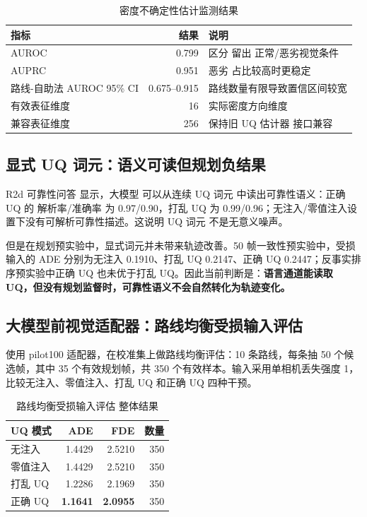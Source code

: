 \documentclass[12pt, a4paper]{ctexart}
\begin{document}
\begin{table}[H]
\centering
\caption{密度不确定性估计监测结果}
\begin{tabular}{lrp{6.5cm}}
\toprule
\textbf{指标} & \textbf{结果} & \textbf{说明} \\
\midrule
AUROC & 0.799 & 区分 留出 正常/恶劣视觉条件 \\
AUPRC & 0.951 & 恶劣 占比较高时更稳定 \\
路线-自助法 AUROC 95\% CI & 0.675--0.915 & 路线数量有限导致置信区间较宽 \\
有效表征维度 & 16 & 实际密度方向维度 \\
兼容表征维度 & 256 & 保持旧 UQ 估计器 接口兼容 \\
\bottomrule
\end{tabular}
\end{table}

\subsection{显式 UQ 词元：语义可读但规划负结果}

R2d 可靠性问答 显示，大模型 可以从连续 UQ 词元 中读出可靠性语义：正确 UQ 的 解析率/准确率 为 0.97/0.90，打乱 UQ 为 0.99/0.96；无注入/零值注入设置下没有可解析可靠性描述。这说明 UQ 词元 不是无意义噪声。

但是在规划预实验中，显式词元并未带来轨迹改善。50 帧一致性预实验中，受损输入的 ADE 分别为无注入 0.1910、打乱 UQ 0.2147、正确 UQ 0.2447；反事实排序预实验中正确 UQ 也未优于打乱 UQ。因此当前判断是：\textbf{语言通道能读取 UQ，但没有规划监督时，可靠性语义不会自然转化为轨迹变化。}

\subsection{大模型前视觉适配器：路线均衡受损输入评估}

使用 pilot100 适配器，在校准集上做路线均衡评估：10 条路线，每条抽 50 个候选帧，其中 35 个有效规划帧，共 350 个有效样本。输入采用单相机丢失强度 1，比较无注入、零值注入、打乱 UQ 和正确 UQ 四种干预。

\begin{table}[H]
\centering
\caption{路线均衡受损输入评估 整体结果}
\begin{tabular}{lrrr}
\toprule
\textbf{UQ 模式} & \textbf{ADE} & \textbf{FDE} & \textbf{数量} \\
\midrule
无注入 & 1.4429 & 2.5210 & 350 \\
零值注入 & 1.4429 & 2.5210 & 350 \\
打乱 UQ & 1.2286 & 2.1969 & 350 \\
正确 UQ & \textbf{1.1641} & \textbf{2.0955} & 350 \\
\bottomrule
\end{tabular}
\end{table}
\end{document}
